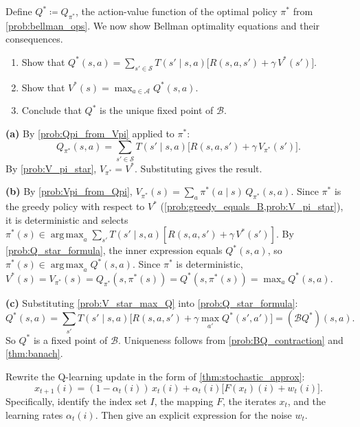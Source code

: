 \documentclass[11pt]{article}
\newcommand{\cS}{\mathcal{S}}
\newcommand{\cA}{\mathcal{A}}
\DeclareMathOperator*{\argmax}{arg\,max}
\begin{document}
\begin{exercise}
\label{prob:bellman_opt_Q} Define $Q^* \coloneqq Q_{\pi^*}$, the action-value function of the optimal policy $\pi^*$ from \cref{prob:bellman_ops}. We now show Bellman optimality equations and their consequences.
\begin{enumerate}
\item\label{prob:Q_star_formula} Show that $Q^*(s,a) = \sum_{s' \in \cS} T(s' \mid s, a)\bigl[R(s,a,s') + \gamma\, V^*(s')\bigr]$.
\item\label{prob:V_star_max_Q} Show that $V^*(s) = \max_{a \in \cA} Q^*(s,a)$.
\item\label{prob:Q_star_fixed_point} Conclude that $Q^*$ is the unique fixed point of $\mathcal{B}$.
\end{enumerate}
\end{exercise}

\begin{solution}
\textbf{(a)} By \cref{prob:Qpi_from_Vpi} applied to $\pi^*$:
$$
Q_{\pi^*}(s,a) = \sum_{s' \in \cS} T(s' \mid s,a)\bigl[R(s,a,s') + \gamma\, V_{\pi^*}(s')\bigr].
$$
By \cref{prob:V_pi_star}, $V_{\pi^*} = V^*$. Substituting gives the result.

\medskip
\textbf{(b)} By \cref{prob:Vpi_from_Qpi}, $V_{\pi^*}(s) = \sum_{a} \pi^*(a \mid s)\, Q_{\pi^*}(s,a)$. Since $\pi^*$ is the greedy policy with respect to $V^*$ (\cref{prob:greedy_equals_B,prob:V_pi_star}), it is deterministic and selects $\pi^*(s) \in \argmax_a \sum_{s'} T(s' \mid s,a)[R(s,a,s') + \gamma\, V^*(s')]$. By \cref{prob:Q_star_formula}, the inner expression equals $Q^*(s,a)$, so $\pi^*(s) \in \argmax_a Q^*(s,a)$. Since $\pi^*$ is deterministic, $V^*(s) = V_{\pi^*}(s) = Q_{\pi^*}(s, \pi^*(s)) = Q^*(s, \pi^*(s)) = \max_a Q^*(s,a)$.

\medskip
\textbf{(c)} Substituting \cref{prob:V_star_max_Q} into \cref{prob:Q_star_formula}:
$$
Q^*(s,a) = \sum_{s'} T(s' \mid s,a)\bigl[R(s,a,s') + \gamma \max_{a'} Q^*(s',a')\bigr] = (\mathcal{B}Q^*)(s,a).
$$
So $Q^*$ is a fixed point of $\mathcal{B}$. Uniqueness follows from \cref{prob:BQ_contraction} and \cref{thm:banach}.
\end{solution}

\begin{exercise}
\label{prob:identify_SA} Rewrite the Q-learning update in the form of \cref{thm:stochastic_approx}:
$$
x_{t+1}(i) = (1 - \alpha_t(i))\, x_t(i) + \alpha_t(i)\bigl[F(x_t)(i) + w_t(i)\bigr].
$$
Specifically, identify the index set $I$, the mapping $F$, the iterates $x_t$, and the learning rates $\alpha_t(i)$. Then give an explicit expression for the noise $w_t$.
\end{exercise}
\end{document}

